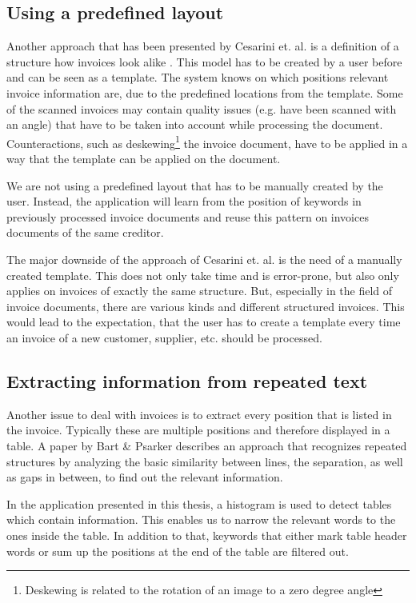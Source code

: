 \subsection{Using a predefined layout}
Another approach that has been presented by Cesarini et. al. is a definition of a structure how invoices look alike \cite{Cesarini98}. This model has to be created by a user before and can be seen as a template. The system knows on which positions relevant invoice information are, due to the predefined locations from the template.
Some of the scanned invoices may contain quality issues (e.g. have been scanned with an angle) that have to be taken into account while processing the document. Counteractions, such as deskewing\footnote{Deskewing is related to the rotation of an image to a zero degree angle} the invoice document, have to be applied in a way that the template can be applied on the document.

We are not using a predefined layout that has to be manually created by the user. Instead, the application will learn from the position of keywords in previously processed invoice documents and reuse this pattern on invoices documents of the same creditor.

The major downside of the approach of Cesarini et. al. \cite{Cesarini98} is the need of a manually created template. This does not only take time and is error-prone, but also only applies on invoices of exactly the same structure. But, especially in the field of invoice documents, there are various kinds and different structured invoices. This would lead to the expectation, that the user has to create a template every time an invoice of a new customer, supplier, etc. should be processed.

\subsection{Extracting information from repeated text}
Another issue to deal with invoices is to extract every position that is listed in the invoice. Typically these are multiple positions and therefore displayed in a table. A paper by Bart \& Psarker \cite{Bart10}  describes an approach that recognizes repeated structures by analyzing the basic similarity between lines, the separation, as well as gaps in between, to find out the relevant information.

In the application presented in this thesis, a histogram is used to detect tables which contain information. This enables us to narrow the relevant words to the ones inside the table. In addition to that, keywords that either mark table header words or sum up the positions at the end of the table are filtered out.

